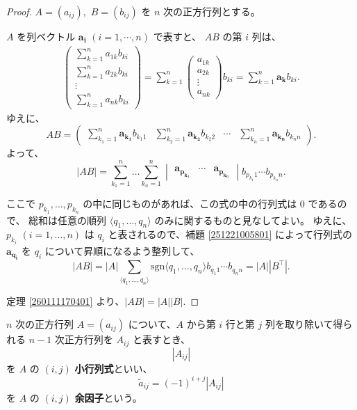 \begin{proof}
  \(A=(a_{ij}),\) \(B=(b_{ij})\) を \(n\) 次の正方行列とする。

  \(A\) を列ベクトル \(\bm{a_i}\) \((i=1,\cdots,n)\) で表すと、
  \(AB\) の第 \(i\) 列は、
  \begin{gather*}
    \begin{pmatrix}
      \displaystyle\sum_{k=1}^n a_{1k}b_{ki} \\
      \displaystyle\sum_{k=1}^n a_{2k}b_{ki} \\
      \vdots \\
      \displaystyle\sum_{k=1}^n a_{nk}b_{ki}
    \end{pmatrix}
    =\sum_{k=1}^n
    \begin{pmatrix}
      a_{1k} \\
      a_{2k} \\
      \vdots \\
      a_{nk}
    \end{pmatrix}
    b_{ki}=\sum_{k=1}^n\bm{a_k}b_{ki}.
  \end{gather*}
  ゆえに、
  \[
    AB=
    \begin{pmatrix}
      \displaystyle\sum_{k_1=1}^n\bm{a_{k_1}}b_{k_1 1} &
      \displaystyle\sum_{k_2=1}^n\bm{a_{k_2}}b_{k_2 2} &
      \cdots                                           &
      \displaystyle\sum_{k_n=1}^n\bm{a_{k_n}}b_{k_n n}
    \end{pmatrix}.
  \]
  よって、
  \[
    |AB|=
    \sum_{k_1=1}^n\ldots\sum_{k_n=1}^n
    \begin{vmatrix}
      \bm{a_{p_{k_1}}} & \cdots & \bm{a_{p_{k_n}}}
    \end{vmatrix}
    b_{p_{k_1} 1}\cdots b_{p_{k_n} n}.
  \]

  ここで \(p_{k_1},\ldots,p_{k_n}\) の中に同じものがあれば、この式の中の行列式は \(0\) であるので、
  総和は任意の順列 \(\langle q_1,\ldots,q_n\rangle\) のみに関するものと見なしてよい。
  ゆえに、\(p_{k_i}\) \((i=1,\ldots,n)\) は \(q_i\) と表されるので、補題 \ref{251221005801} によって行列式の \(\bm{a_{q_i}}\) を \(q_i\) について昇順になるよう整列して、
  \[|AB|=|A|\sum_{\langle q_1,\ldots,q_n\rangle}\mathrm{sgn}\langle q_1,\ldots,q_n\rangle b_{q_1 1}\cdots b_{q_n n}=|A||B^\top|.\]

  定理 \ref{260111170401} より、\(|AB|=|A||B|.\)
\end{proof}

\begin{dfn}
  \(n\) 次の正方行列 \(A=(a_{ij})\) について、\(A\) から第 \(i\) 行と第 \(j\) 列を取り除いて得られる \(n-1\) 次正方行列を \(A_{ij}\) と表すとき、
  \[|A_{ij}|\]
  を \(A\) の \((i,j)\) \textbf{小行列式}といい、
  \[\tilde{a}_{ij}=(-1)^{i+j}|A_{ij}|\]
  を \(A\) の \((i,j)\) \textbf{余因子}という。
\end{dfn}

